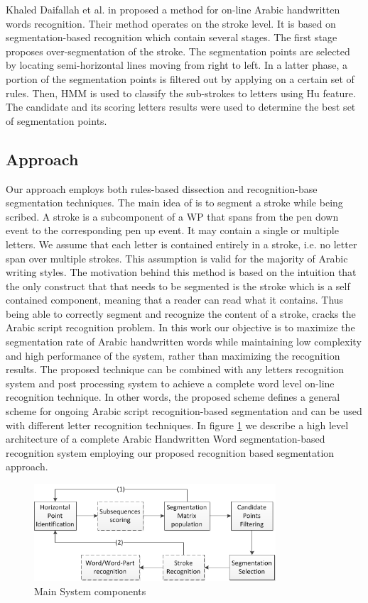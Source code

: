\documentclass[12pt,journal,compsoc]{IEEEtran}
\begin{document}
Khaled Daifallah et al. in \cite{daifallah2009recognition} proposed a method for on-line Arabic handwritten words recognition. Their method operates on the stroke level. It is based on segmentation-based recognition which contain several stages. The first stage proposes over-segmentation of the stroke. The segmentation points are selected by locating semi-horizontal lines moving from right to left. In a latter phase, a portion of the segmentation points is filtered out by applying on a certain set of rules. Then, HMM is used to classify the sub-strokes to letters using Hu feature. The candidate and its scoring letters results were used to determine the best set of segmentation points.   


\subsection{Approach}
Our approach employs both rules-based dissection and recognition-base segmentation techniques. The main idea of is to  segment a stroke while being scribed. A stroke is a subcomponent of a WP that spans from the pen down event to the corresponding pen up event. It may contain a single or multiple letters. We assume that each letter is contained entirely in a stroke, i.e. no letter span over multiple strokes. This assumption is valid for the majority of Arabic writing styles. The motivation behind this method is based on the intuition that the only construct that that needs to be segmented is the stroke which is a self contained component, meaning that a reader can read what it contains. Thus being able to correctly segment and recognize the content of a stroke, cracks the Arabic script recognition problem. In this work our objective is to maximize the segmentation rate of Arabic handwritten words while maintaining low complexity and high performance of the system, rather than maximizing the recognition results. 
The proposed technique can be combined with any letters recognition system and post processing system to achieve a complete word level on-line recognition technique. In other words, the proposed scheme defines a general scheme for ongoing Arabic script recognition-based segmentation and can be used with different letter recognition techniques. In figure \ref{fig:main_system_components} we describe a high level architecture of a complete Arabic Handwritten Word segmentation-based recognition system employing our proposed recognition based segmentation approach. 
  
\begin{figure}
\centering
\includegraphics[width=9cm]{./figures/main_system_components}
\caption{Main System components}
\label{fig:main_system_components}
\end{figure}
\end{document}
